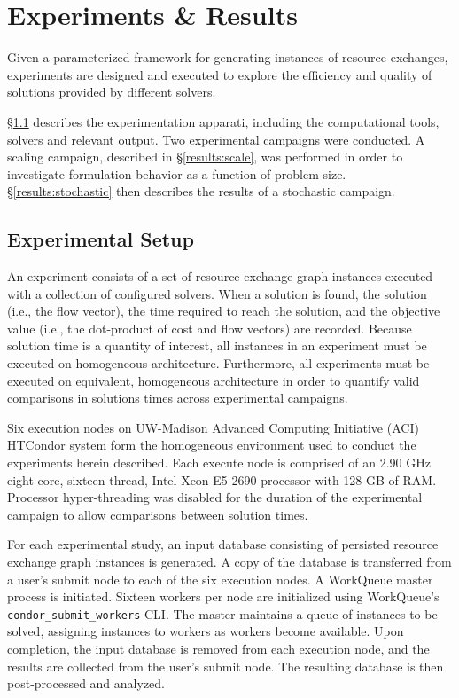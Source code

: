 \chapter{Experiments \& Results}\label{ch:results}

Given a parameterized framework for generating instances of resource exchanges,
experiments are designed and executed to explore the efficiency and quality of
solutions provided by different solvers. 

\S \ref{results:setup} describes the experimentation apparati, including the
computational tools, solvers and relevant output. Two experimental campaigns
were conducted. A scaling campaign, described in \S \ref{results:scale}, was
performed in order to investigate formulation behavior as a function of problem
size. \S \ref {results:stochastic} then describes the results of a stochastic
campaign.

\section{Experimental Setup}\label{results:setup}

An experiment consists of a set of resource-exchange graph instances executed
with a collection of configured solvers. When a solution is found, the solution
(i.e., the flow vector), the time required to reach the solution, and the
objective value (i.e., the dot-product of cost and flow vectors) are
recorded. Because solution time is a quantity of interest, all instances in an
experiment must be executed on homogeneous architecture. Furthermore, all
experiments must be executed on equivalent, homogeneous architecture in order to
quantify valid comparisons in solutions times across experimental campaigns.

Six execution nodes on UW-Madison Advanced Computing Initiative (ACI) HTCondor
system form the homogeneous environment used to conduct the experiments herein
described. Each execute node is comprised of an 2.90 GHz eight-core,
sixteen-thread, Intel Xeon E5-2690 \cite{intelproc} processor with 128 GB of
RAM. Processor hyper-threading was disabled for the duration of the experimental
campaign to allow comparisons between solution times.

For each experimental study, an input database consisting of persisted resource
exchange graph instances is generated. A copy of the database is transferred
from a user's submit node to each of the six execution nodes. A WorkQueue master
process is initiated. Sixteen workers per node are initialized using WorkQueue's
\texttt{condor\_submit\_workers} CLI. The master maintains a queue of instances
to be solved, assigning instances to workers as workers become available. Upon
completion, the input database is removed from each execution node, and the
results are collected from the user's submit node. The resulting database is
then post-processed and analyzed.

